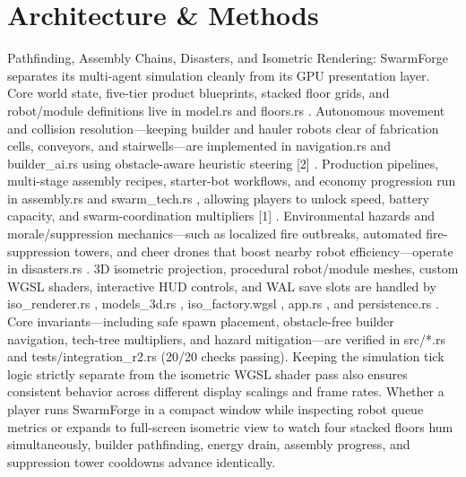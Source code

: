 \documentclass[10pt,letterpaper]{article}
\begin{document}
\section{Architecture \& Methods}
Pathfinding, Assembly Chains, Disasters, and Isometric Rendering: SwarmForge separates its multi-agent simulation cleanly from its GPU presentation layer. Core world state, five-tier product blueprints, stacked floor grids, and robot/module definitions live in model.rs and floors.rs . Autonomous movement and collision resolution---keeping builder and hauler robots clear of fabrication cells, conveyors, and stairwells---are implemented in navigation.rs and builder\_ai.rs using obstacle-aware heuristic steering [2] . Production pipelines, multi-stage assembly recipes, starter-bot workflows, and economy progression run in assembly.rs and swarm\_tech.rs , allowing players to unlock speed, battery capacity, and swarm-coordination multipliers [1] . Environmental hazards and morale/suppression mechanics---such as localized fire outbreaks, automated fire-suppression towers, and cheer drones that boost nearby robot efficiency---operate in disasters.rs . 3D isometric projection, procedural robot/module meshes, custom WGSL shaders, interactive HUD controls, and WAL save slots are handled by iso\_renderer.rs , models\_3d.rs , iso\_factory.wgsl , app.rs , and persistence.rs . Core invariants---including safe spawn placement, obstacle-free builder navigation, tech-tree multipliers, and hazard mitigation---are verified in src/*.rs and tests/integration\_r2.rs (20/20 checks passing). Keeping the simulation tick logic strictly separate from the isometric WGSL shader pass also ensures consistent behavior across different display scalings and frame rates. Whether a player runs SwarmForge in a compact window while inspecting robot queue metrics or expands to full-screen isometric view to watch four stacked floors hum simultaneously, builder pathfinding, energy drain, assembly progress, and suppression tower cooldowns advance identically.
\end{document}
